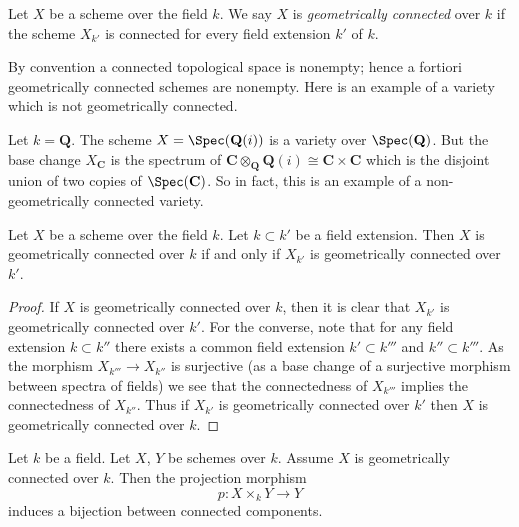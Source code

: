\begin{definition}
\label{definition-geometrically-connected}
Let $X$ be a scheme over the field $k$. We say $X$ is
{\it geometrically connected} over $k$ if the scheme $X_{k'}$ is connected
for every field extension $k'$ of $k$.
\end{definition}

\noindent
By convention a connected topological space is nonempty; hence a fortiori
geometrically connected schemes are nonempty.
Here is an example of a variety which is not geometrically connected.

\begin{example}
\label{example-not-geometrically-irreducible}
Let $k = \mathbf{Q}$. The scheme
$X = \Spec(\mathbf{Q}(i))$ is a variety over $\Spec(\mathbf{Q})$.
But the base change $X_{\mathbf{C}}$ is the spectrum of
$\mathbf{C} \otimes_{\mathbf{Q}} \mathbf{Q}(i) \cong
\mathbf{C} \times \mathbf{C}$ which is the disjoint union of
two copies of $\Spec(\mathbf{C})$. So in fact, this is an
example of a non-geometrically connected variety.
\end{example}

\begin{lemma}
\label{lemma-geometrically-connected-check-after-extension}
Let $X$ be a scheme over the field $k$.
Let $k \subset k'$ be a field extension.
Then $X$ is geometrically connected over $k$ if and only if
$X_{k'}$ is geometrically connected over $k'$.
\end{lemma}

\begin{proof}
If $X$ is geometrically connected over $k$, then it is clear that
$X_{k'}$ is geometrically connected over $k'$. For the converse, note
that for any field extension $k \subset k''$ there exists a common
field extension $k' \subset k'''$ and $k'' \subset k'''$. As the
morphism $X_{k'''} \to X_{k''}$ is surjective (as a base change of
a surjective morphism between spectra of fields) we see that the
connectedness of $X_{k'''}$ implies the connectedness of $X_{k''}$.
Thus if $X_{k'}$ is geometrically connected over $k'$ then
$X$ is geometrically connected over $k$.
\end{proof}

\begin{lemma}
\label{lemma-bijection-connected-components}
Let $k$ be a field.
Let $X$, $Y$ be schemes over $k$.
Assume $X$ is geometrically connected over $k$.
Then the projection morphism
$$
p : X \times_k Y \longrightarrow Y
$$
induces a bijection between connected components.
\end{lemma}

